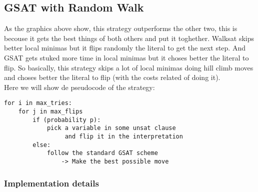 
\subsection{GSAT with Random Walk}
As the graphics above show, this strategy outperforms the other two, this is becouse it gets the best things of both others and put it toghether. Walksat skips better local minimas but it flips randomly the literal to get the next step. And GSAT gets stuked more time in local minimas but it choses better the literal to flip. So basically, this strategy skips a lot of local minimas doing hill climb moves and choses better the literal to flip (with the costs related of doing it).\\
Here we will show de pseudocode of the strategy:
\begin{lstlisting}
for i in max_tries:
	for j in max_flips
		if (probability p):
			pick a variable in some unsat clause
				 and flip it in the interpretation
		else:
			follow the standard GSAT scheme 
				-> Make the best possible move
\end{lstlisting}
\subsubsection{Implementation details}


